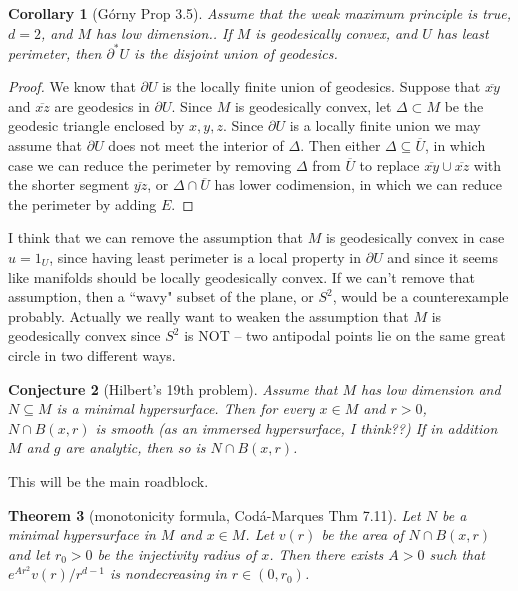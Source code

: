 \documentclass[reqno,12pt,letterpaper]{amsart}
\newtheorem{theorem}{Theorem}[section]
\newtheorem{corollary}[theorem]{Corollary}
\newtheorem{conjecture}[theorem]{Conjecture}
\theoremstyle{definition}
\numberwithin{equation}{section}
\begin{document}
\begin{corollary}[G\'orny Prop 3.5]
Assume that the weak maximum principle is true, $d = 2$, and $M$ has low dimension..
If $M$ is geodesically convex, and $U$ has least perimeter, then $\partial^* U$ is the disjoint union of geodesics.
\end{corollary}
\begin{proof}
We know that $\partial U$ is the locally finite union of geodesics.
Suppose that $\overline{xy}$ and $\overline{xz}$ are geodesics in $\partial U$.
Since $M$ is geodesically convex, let $\Delta \subset M$ be the geodesic triangle enclosed by $x,y,z$.
Since $\partial U$ is a locally finite union we may assume that $\partial U$ does not meet the interior of $\Delta$.
Then either $\Delta \subseteq \overline U$, in which case we can reduce the perimeter by removing $\Delta$ from $\overline U$ to replace $\overline{xy} \cup \overline{xz}$ with the shorter segment $\overline{yz}$, or $\Delta \cap \overline U$ has lower codimension, in which we can reduce the perimeter by adding $E$.
\end{proof}

I think that we can remove the assumption that $M$ is geodesically convex in case $u = 1_U$, since having least perimeter is a local property in $\partial U$ and since it seems like manifolds should be locally geodesically convex.
If we can't remove that assumption, then a ``wavy" subset of the plane, or $S^2$, would be a counterexample probably.
Actually we really want to weaken the assumption that $M$ is geodesically convex since $S^2$ is NOT -- two antipodal points lie on the same great circle in two different ways.

\begin{conjecture}[Hilbert's 19th problem]
Assume that $M$ has low dimension and $N \subseteq M$ is a minimal hypersurface.
Then for every $x \in M$ and $r > 0$, $N \cap B(x, r)$ is smooth (as an immersed hypersurface, I think??)
If in addition $M$ and $g$ are analytic, then so is $N \cap B(x, r)$.
\end{conjecture}

This will be the main roadblock.

\begin{theorem}[monotonicity formula, Cod\'a-Marques Thm 7.11]
Let $N$ be a minimal hypersurface in $M$ and $x \in M$.
Let $v(r)$ be the area of $N \cap B(x, r)$ and let $r_0 > 0$ be the injectivity radius of $x$.
Then there exists $A > 0$ such that $e^{Ar^2} v(r)/r^{d - 1}$ is nondecreasing in $r \in (0, r_0)$.
\end{theorem}
\end{document}
